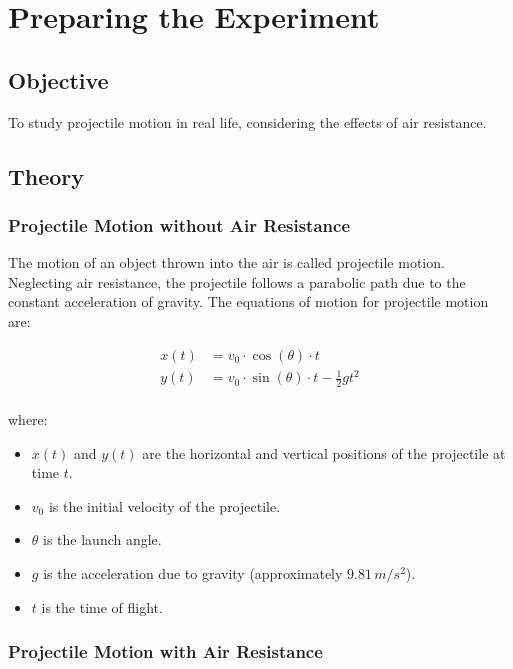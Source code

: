 \chapter{Preparing the Experiment}

\section{Objective}

To study projectile motion in real life, considering the effects of air resistance.

\section{Theory}

\subsection{Projectile Motion without Air Resistance}

The motion of an object thrown into the air is called projectile motion. Neglecting air resistance, the projectile follows a parabolic path due to the constant acceleration of gravity. The equations of motion for projectile motion are:

\begin{equation}
	\begin{split}
		x(t) & = v_{0} \cdot \cos(\theta) \cdot t                     \\
		y(t) & = v_{0} \cdot \sin(\theta) \cdot t - \frac{1}{2} g t^2 \\
	\end{split}
\end{equation}

\noindent where:

\begin{itemize}
	\item $x(t)$ and $y(t)$ are the horizontal and vertical positions of the projectile at time $t$.
	\item $v_{0}$ is the initial velocity of the projectile.
	\item $\theta$ is the launch angle.
	\item $g$ is the acceleration due to gravity (approximately $9.81 \, m/s^2$).
	\item $t$ is the time of flight.
\end{itemize}

\subsection{Projectile Motion with Air Resistance}

